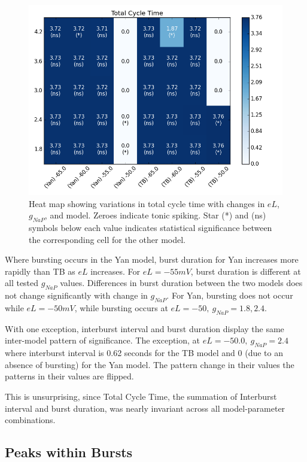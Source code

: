 \documentclass[11pt]{article}
\begin{document}
\begin{figure}[h]
	\includegraphics[scale=0.4]{heatmap_Total_Cycle_Time.png}
	\caption{Heat map showing variations in total cycle time with changes in $eL$, $g_{NaP}$, and model. Zeroes indicate tonic spiking. Star (*) and (ns) symbols below each value indicates statistical significance between the corresponding cell for the other model.}
	\label{fig:hmTCT}
\end{figure}

   


Where bursting occurs in the Yan model, burst duration for Yan increases more rapidly than TB as $eL$ increases. For $eL=-55 mV$, burst duration is different at all tested $g_{NaP}$ values.
Differences in burst duration between the two models does not change significantly with change in $g_{NaP}$. For Yan, bursting does not occur while $eL = -50 mV$, while bursting occurs at $eL=-50,\  g_{NaP}=1.8, 2.4$. 

With one exception, interburst interval and burst duration display the same inter-model pattern of significance. The exception, at $eL=-50.0,\ g_{NaP} = 2.4$ where interburst interval is 0.62 seconds for the TB model and 0 (due to an absence of bursting) for the Yan model. 
The pattern change in their values 
the patterns in their values are flipped.

This is unsurprising, since Total Cycle Time, the summation of Interburst interval and burst duration, was nearly invariant across all model-parameter combinations. 

\subsection{Peaks within Bursts}
\end{document}

